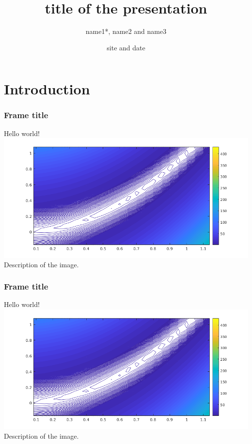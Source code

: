 \documentclass[aspectratio=169]{beamer}
\title{title of the presentation}
\author[name1, name2, name3]{name1*, name2 and name3}
\date[site]{site and date}
\begin{document}
\begin{frame}
 \titlepage 
\end{frame}

\section{Introduction}
\begin{frame}
 \frametitle{Frame title}
 Hello world!\\
 \includegraphics[scale=0.5]{images/rosenbrockzoom.png}\\
 Description of the image.
\end{frame}

\begin{frame}
 \frametitle{Frame title}
 Hello world!\\
 \includegraphics[scale=0.5]{images/rosenbrockzoom.png}\\
 Description of the image.
\end{frame}
\end{document}
